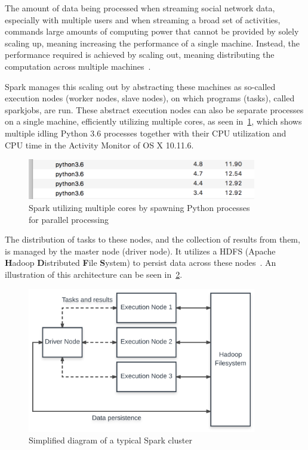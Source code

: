 The amount of data being processed when streaming social network data,
especially with multiple users and when streaming a broad set of activities,
commands large amounts of computing power that cannot be provided by solely scaling up,
meaning increasing the performance of a single machine.
Instead, the performance required is achieved by scaling out,
meaning distributing the computation across multiple machines~\cite{Wolke2010}.

Spark manages this scaling out by abstracting these machines as so-called execution nodes (worker nodes, slave nodes),
on which programs (tasks), called sparkjobs, are run.
These abstract execution nodes can also be separate processes on a single machine,
efficiently utilizing multiple cores, as seen in~\cref{fig:spark_processes},
which shows multiple idling Python 3.6 processes together with their CPU utilization and CPU time
in the Activity Monitor of OS X 10.11.6.

\begin{figure}
    \centering
    \caption{Spark utilizing multiple cores by spawning Python processes \\for parallel processing}
    \label{fig:spark_processes}
    \includegraphics[width=10cm]{../images/python_processes.png}
\end{figure}

The distribution of tasks to these nodes, and the collection of results from them,
is managed by the master node (driver node).
It utilizes a HDFS (Apache \textbf{H}adoop \textbf{D}istributed \textbf{F}ile \textbf{S}ystem) to persist data across these nodes~\cite{Zaharia2016}.
An illustration of this architecture can be seen in~\cref{fig:spark}.

\begin{figure}
    \centering
    \caption{Simplified diagram of a typical Spark cluster}
    \label{fig:spark}
    \includegraphics[width=10cm]{../figures/spark.pdf}
\end{figure}

